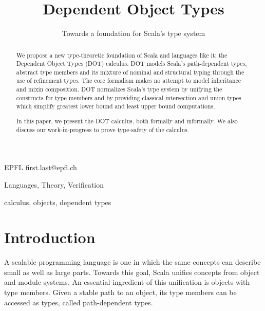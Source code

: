 \documentclass[9pt]{sigplanconf}
\begin{document}
\copyrightdata{[to be supplied]} 

\title{Dependent Object Types}
\subtitle{Towards a foundation for Scala's type system}

           {EPFL}
           {first.last@epfl.ch}

\maketitle

\begin{abstract}
We propose a new type-theoretic foundation of Scala and languages like
it: the Dependent Object Types (DOT) calculus. DOT models Scala's
path-dependent types, abstract type members and its mixture of nominal
and structural typing through the use of refinement types. The core
formalism makes no attempt to model inheritance and mixin
composition. DOT normalizes Scala's type system by unifying the
constructs for type members and by providing classical intersection
and union types which simplify greatest lower bound and least upper bound computations.

In this paper, we present the DOT calculus, both formally and
informally. We also discuss our work-in-progress to prove type-safety
of the calculus.
\end{abstract}


\terms
Languages, Theory, Verification

\keywords
calculus, objects, dependent types%

\section{Introduction}
A scalable programming language is one in which the same concepts can
describe small as well as large parts. Towards this goal, Scala
unifies concepts from object and module systems. An essential
ingredient of this unification is objects with type members. Given a
stable path to an object, its type members can be accessed as types,
called path-dependent types.
\end{document}
